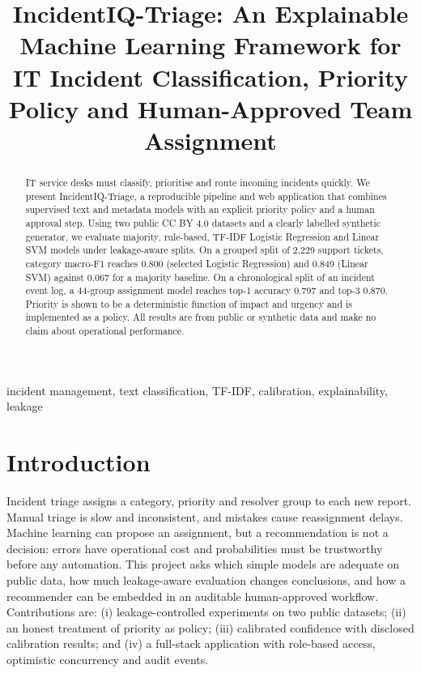 \documentclass[conference]{IEEEtran}
\begin{document}
\title{IncidentIQ-Triage: An Explainable Machine Learning Framework for IT Incident Classification, Priority Policy and Human-Approved Team Assignment}

\author{
}

\maketitle

\begin{abstract}
IT service desks must classify, prioritise and route incoming incidents quickly. We present IncidentIQ-Triage, a reproducible pipeline and web application that combines supervised text and metadata models with an explicit priority policy and a human approval step. Using two public CC BY 4.0 datasets and a clearly labelled synthetic generator, we evaluate majority, rule-based, TF-IDF Logistic Regression and Linear SVM models under leakage-aware splits. On a grouped split of 2{,}229 support tickets, category macro-F1 reaches 0.800 (selected Logistic Regression) and 0.849 (Linear SVM) against 0.067 for a majority baseline. On a chronological split of an incident event log, a 44-group assignment model reaches top-1 accuracy 0.797 and top-3 0.870. Priority is shown to be a deterministic function of impact and urgency and is implemented as a policy. All results are from public or synthetic data and make no claim about operational performance.
\end{abstract}

\begin{IEEEkeywords}
incident management, text classification, TF-IDF, calibration, explainability, leakage
\end{IEEEkeywords}

\section{Introduction}
Incident triage assigns a category, priority and resolver group to each new report. Manual triage is slow and inconsistent, and mistakes cause reassignment delays. Machine learning can propose an assignment, but a recommendation is not a decision: errors have operational cost and probabilities must be trustworthy before any automation. This project asks which simple models are adequate on public data, how much leakage-aware evaluation changes conclusions, and how a recommender can be embedded in an auditable human-approved workflow. Contributions are: (i) leakage-controlled experiments on two public datasets; (ii) an honest treatment of priority as policy; (iii) calibrated confidence with disclosed calibration results; and (iv) a full-stack application with role-based access, optimistic concurrency and audit events.
\end{document}
